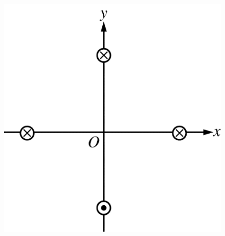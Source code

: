 \begin{figure}[H]
    \centering
    \includegraphics[scale=0.4]{images/img-014-035.png}
\end{figure}

